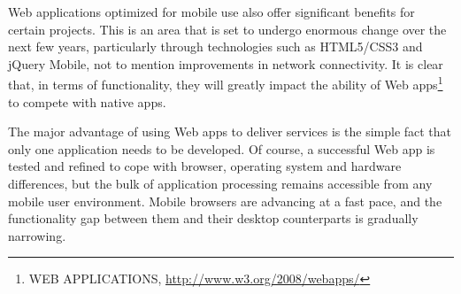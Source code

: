 Web applications optimized for mobile use also offer significant benefits for certain projects. This is an area that is set to undergo enormous change over the next few years, particularly through technologies such as HTML5/CSS3 and jQuery Mobile, not to mention improvements in network connectivity. It is clear that, in terms of functionality, they will greatly impact the ability of Web apps\footnote{WEB APPLICATIONS, \url{http://www.w3.org/2008/webapps/}} to compete with native apps.

The major advantage of using Web apps to deliver services is the simple fact that only one application needs to be developed. Of course, a successful Web app is tested and refined to cope with browser, operating system and hardware differences, but the bulk of application processing remains accessible from any mobile user environment. Mobile browsers are advancing at a fast pace, and the functionality gap between them and their desktop counterparts is gradually narrowing.

